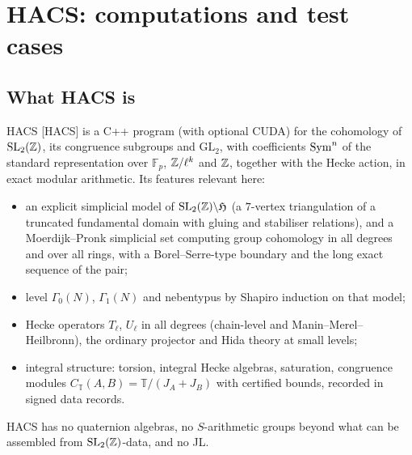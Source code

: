 \documentclass[11pt]{amsart}
\theoremstyle{plain}
\theoremstyle{definition}
\theoremstyle{remark}
\newcommand{\F}{\mathbb{F}}\newcommand{\A}{\mathbb{A}}\newcommand{\cO}{\mathcal{O}}
\newcommand{\GL}{\mathrm{GL}}\newcommand{\SL}{\mathrm{SL}}\newcommand{\PGL}{\mathrm{PGL}}
\newcommand{\T}{\mathbb{T}}\newcommand{\m}{\mathfrak{m}}\newcommand{\cT}{\mathcal{T}}\newcommand{\cX}{\mathcal{X}}
\begin{document}
\section{HACS: computations and test cases}\label{sec:hacs}

\subsection{What HACS is}
HACS [HACS] is a C++ program (with optional CUDA) for the cohomology of $\SL_2(\Z)$, its congruence subgroups and $\GL_2$, with coefficients $\mathrm{Sym}^n$ of the standard representation over $\F_p$, $\mathbb{Z}/\ell^k$ and $\mathbb{Z}$, together with the Hecke action, in exact modular arithmetic. Its features relevant here:
\begin{itemize}
\item an explicit simplicial model of $\SL_2(\Z)\backslash\Hb$ (a $7$-vertex triangulation of a truncated fundamental domain with gluing and stabiliser relations), and a Moerdijk--Pronk simplicial set computing group cohomology in all degrees and over all rings, with a Borel--Serre-type boundary and the long exact sequence of the pair;
\item level $\Gamma_0(N)$, $\Gamma_1(N)$ and nebentypus by Shapiro induction on that model;
\item Hecke operators $T_\ell$, $U_\ell$ in all degrees (chain-level and Manin--Merel--Heilbronn), the ordinary projector and Hida theory at small levels;
\item integral structure: torsion, integral Hecke algebras, saturation, congruence modules $C_\T(A,B)=\T/(J_A+J_B)$ with certified bounds, recorded in signed data records.
\end{itemize}
HACS has no quaternion algebras, no $S$-arithmetic groups beyond what can be assembled from $\SL_2(\Z)$-data, and no JL.
\end{document}
